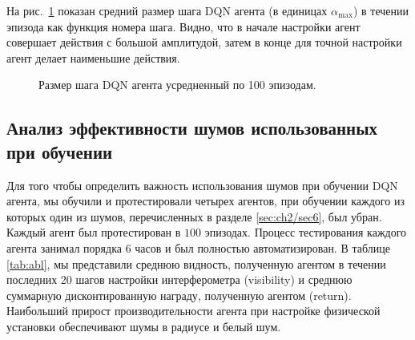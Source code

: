 На рис.~\ref{fig:step_size} показан средний размер шага DQN агента (в единицах $\alpha_{\max}$) в течении эпизода как функция номера шага. Видно, что в начале настройки агент совершает действия с большой амплитудой, затем в конце для точной настройки агент делает наименьшие действия. 

\begin{figure}[ht]
\caption{Размер шага DQN агента усредненный по 100 эпизодам.}
\label{fig:step_size}
\end{figure}

\subsection{Анализ эффективности шумов использованных при обучении}

Для того чтобы определить важность использования шумов при обучении DQN агента, мы обучили и протестировали четырех агентов, при обучении каждого из которых один из шумов, перечисленных в разделе \ref{sec:ch2/sec6}, был убран. Каждый агент был протестирован в $100$ эпизодах. Процесс тестирования каждого агента занимал порядка 6 часов и был полностью автоматизирован. В таблице \ref{tab:abl}, мы представили среднюю видность, полученную агентом в течении последних 20 шагов настройки интерферометра (visibility) и среднюю суммарную дисконтированную награду, полученную агентом (return). Наибольший прирост производительности агента при настройке физической установки обеспечивают шумы в радиусе и белый шум. 

